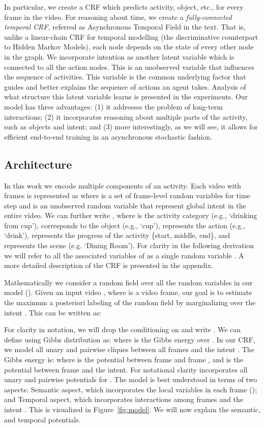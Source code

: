 \documentclass[10pt,twocolumn,letterpaper]{article}
\begin{document}
In particular, we create a CRF which predicts activity, object, etc., for every frame in the video. For reasoning about time, we create a \emph{fully-connected temporal CRF}, referred as Asynchronous Temporal Field in the text. That is, unlike a linear-chain CRF for temporal modelling (the discriminative counterpart to Hidden Markov Models), each node depends on the state of every other node in the graph. We incorporate intention as another latent variable which is connected to all the action nodes. 
This is an unobserved variable that influences the sequence of activities. This variable is the common underlying factor that guides and better explains the sequence of actions an agent takes. Analysis of what structure this latent variable learns is presented in the experiments.
Our model has three advantages: (1) it addresses the problem of long-term interactions; (2) it incorporates reasoning about multiple parts of the activity, such as objects and intent; and (3) more interestingly, as we will see, it allows for efficient end-to-end training in an asynchronous stochastic fashion.

\subsection{Architecture}
In this work we encode multiple components of an activity. Each video with  frames is represented as  where  is a set of frame-level random variables for time step  and  is an unobserved random variable that represent global intent in the entire video. We can further write , where  is the activity category (e.g., `drinking from cup'),  corresponds to the object (e.g., `cup'),  represents the action (e.g., `drink'),  represents the progress of the activity \{start, middle, end\}, and  represents the scene (e.g. `Dining Room'). 
For clarity in the following derivation we will refer to all the associated variables of  as a single random variable . A more detailed description of the CRF is presented in the appendix.

Mathematically we consider a random field  over all the random variables in our model (). Given an input video , where  is a video frame, our goal is to estimate the maximum a posteriori labeling of the random field by marginalizing over the intent . This can be written as:

For clarity in notation, we will drop the conditioning on  and write . We can define  using Gibbs distribution as:  where  is the Gibbs energy over . In our CRF, we model all unary and pairwise cliques between all frames  and the intent . The Gibbs energy is:
\begingroup\makeatletter\def\f@size{8}\check@mathfonts
\def\maketag@@@#1{\hbox{\m@th\normalsize\normalfont#1}}
\endgroup
where  is the potential between frame  and frame , and  is the potential between frame  and the intent. For notational clarity  incorporates all unary and pairwise potentials for . 
The model is best understood in terms of two aspects: Semantic aspect, which incorporates the local variables in each frame (); and Temporal aspect, which incorporates interactions among frames and the intent . This is visualized in Figure~\ref{fig:model}. 
We will now explain the semantic, and temporal potentials.
\end{document}
